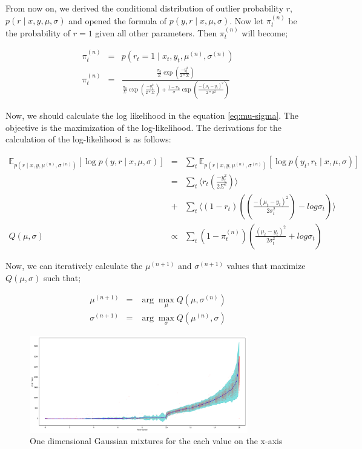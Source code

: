 From now on, we derived the conditional distribution of outlier probability $r$, $p\left(r\mid x,y,\mu,\sigma\right)$ and opened the formula of $p\left(y,r\mid x,\mu,\sigma\right)$. Now let $\pi_t^{(n)}$ be the probability of $r=1$ given all other parameters. Then $\pi_t^{(n)}$ will become;

\begin{eqnarray}
    \pi_t^{(n)} &=& p\left(r_t=1\mid x_t, y_t, \mu^{(n)} ,\sigma^{(n)}\right) \\
    \pi_t^{(n)} &=& \frac{\frac{\pi_0}{\Sigma}\exp\left(\frac{-y_t^2}{2*\Sigma}\right)}{\frac{\pi_0}{\Sigma}\exp\left(\frac{-y_t^2}{2*\Sigma}\right) + \frac{1-\pi_0}{\sigma}\exp\left(\frac{-(\mu_t-y_t)^2}{2*\sigma^2}\right)}
\end{eqnarray}

Now, we should calculate the log likelihood in the equation \ref{eq:mu-sigma}. The objective is the maximization of the log-likelihood. 
The derivations for the calculation of the log-likelihood is as follows:

\begin{eqnarray}
    \mathbb{E}_{p\left(r\mid x,y,\mu^{(n)},\sigma^{(n)}\right)} \left[\log p\left(y,r\mid x,\mu,\sigma\right)\right] &=&\sum_t \mathbb{E}_{p\left(r\mid x,y,\mu^{(n)},\sigma^{(n)}\right)} \left[\log p\left(y_t,r_t\mid x,\mu,\sigma\right)\right] \nonumber\\
    &=&\sum_t\Bigg\langle r_t\left(\frac{-y_t^2}{2\Sigma^2}\right) \Bigg\rangle \nonumber \\
    &+&\sum_t\Bigg\langle(1-r_t)\left(\left(\frac{-(\mu_t-y_t)^2}{2\sigma_t^2}\right) -log\sigma_t\right)\Bigg\rangle \nonumber\\
    Q(\mu,\sigma)&\propto& \sum_t(1-\pi_t^{(n)})\left(\frac{(\mu_t-y_t)^2}{2\sigma_t^2} + log\sigma_t\right)
\end{eqnarray}

Now, we can iteratively calculate the $\mu^{(n+1)}$ and $\sigma^{(n+1)}$ values that maximize $Q(\mu,\sigma)$ such that;

\begin{eqnarray}
\mu^{(n+1)} &=& \arg\max_{\mu} Q(\mu,\sigma^{(n)}) \\
\sigma^{(n+1)} &=& \arg\max_{\sigma} Q(\mu^{(n)},\sigma)
\end{eqnarray}  

\begin{figure}
    \centering
    \includegraphics[width=0.85\textwidth]{figures/gmm-em.pdf}
    \caption{One dimensional Gaussian mixtures for the each value on the x-axis}
    \label{fig:gmm-em}
\end{figure}

